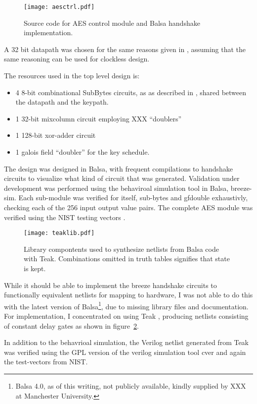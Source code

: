 \begin{figure}[htbp]
  \centering
  \texttt{[image: aesctrl.pdf]}
  \caption{Source code for AES control module and Balsa handshake
    implementation.}
  \label{fig:aesctrl}
\end{figure}

A 32 bit datapath was chosen for the same reasons given in
\cite{ekelund}, assuming that the same reasoning can be used for
clockless design.

The resources used in the top level design is:
\begin{itemize}
   \item 4 8-bit combinational SubBytes circuits, as as described in
     \cite{combsbox}, shared between the datapath and the keypath.
   \item 1 32-bit mixcolumn circuit employing XXX ``doublers''
   \item 1 128-bit xor-adder circuit
   \item 1 galois field ``doubler'' for the key schedule.
\end{itemize}

The design was designed in Balsa, with frequent compilations to
handshake circuits to visualize what kind of circuit that was
generated. Validation under development was performed using the
behaviroal simulation tool in Balsa, breeze-sim. Each sub-module was
verified for itself, sub-bytes and gfdouble exhaustivly, checking each
of the 256 input output value pairs. The complete AES module was
verified using the NIST testing vectors \cite{nisttest}.


\begin{figure}[htbp]
  \centering
  \texttt{[image: teaklib.pdf]}
  \caption{Library compontents used to synthesize netlists from Balsa
    code with Teak. Combinations omitted in truth tables signifies
    that state is kept.}
  \label{fig:teaklib}
\end{figure}

While it should be able to implement the breeze handshake circuits to
functionally equivalent netlists for mapping to hardware, I was not
able to do this with the latest version of Balsa\footnote{Balsa 4.0,
  as of this writing, not publicly available, kindly supplied by XXX
  at Manchester University.}, due to missing library files and
documentation. For implementation, I concentrated on using Teak
\cite{teak}, producing netlists consisting of constant delay gates as
shown in figure~\ref{fig:teaklib}.

In addition to the behavrioal simulation, the Verilog netlist
generated from Teak was verified using the GPL version of the verilog
simulation tool cver and again the test-vectors from NIST.
